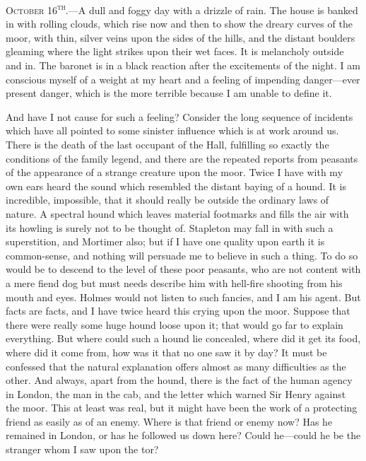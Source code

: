 \documentclass[paper=5.5in:8.5in,BCOR=7mm,twoside,DIV=calc,12pt,usegeometry,openany,chapterprefix,endperiod,headings=big]{scrbook} %
\begin{document}
\textsc{October 16\textsuperscript{th}.}---A dull and foggy day with a drizzle of rain. The house is banked in with rolling clouds, which rise now and then to show the dreary curves of the moor, with thin, silver veins upon the sides of the hills, and the distant boulders gleaming where the light strikes upon their wet faces. It is melancholy outside and in. The baronet is in a black reaction after the excitements of the night. I am conscious myself of a weight at my heart and a feeling of impending danger---ever present danger, which is the more terrible because I am unable to define it.

And have I not cause for such a feeling? Consider the long sequence of incidents which have all pointed to some sinister influence which is at work around us. There is the death of the last occupant of the Hall, fulfilling so exactly the conditions of the family legend, and there are the repeated reports from peasants of the appearance of a strange creature upon the moor. Twice I have with my own ears heard the sound which resembled the distant baying of a hound. It is incredible, impossible, that it should really be outside the ordinary laws of nature. A spectral hound which leaves material footmarks and fills the air with its howling is surely not to be thought of. Stapleton may fall in with such a superstition, and Mortimer also; but if I have one quality upon earth it is common-sense, and nothing will persuade me to believe in such a thing. To do so would be to descend to the level of these poor peasants, who are not content with a mere fiend dog but must needs describe him with hell-fire shooting from his mouth and eyes. Holmes would not listen to such fancies, and I am his agent. But facts are facts, and I have twice heard this crying upon the moor. Suppose that there were really some huge hound loose upon it; that would go far to explain everything. But where could such a hound lie concealed, where did it get its food, where did it come from, how was it that no one saw it by day? It must be confessed that the natural explanation offers almost as many difficulties as the other. And always, apart from the hound, there is the fact of the human agency in London, the man in the cab, and the letter which warned Sir Henry against the moor. This at least was real, but it might have been the work of a protecting friend as easily as of an enemy. Where is that friend or enemy now? Has he remained in London, or has he followed us down here? Could he---could he be the stranger whom I saw upon the tor?
\end{document}
